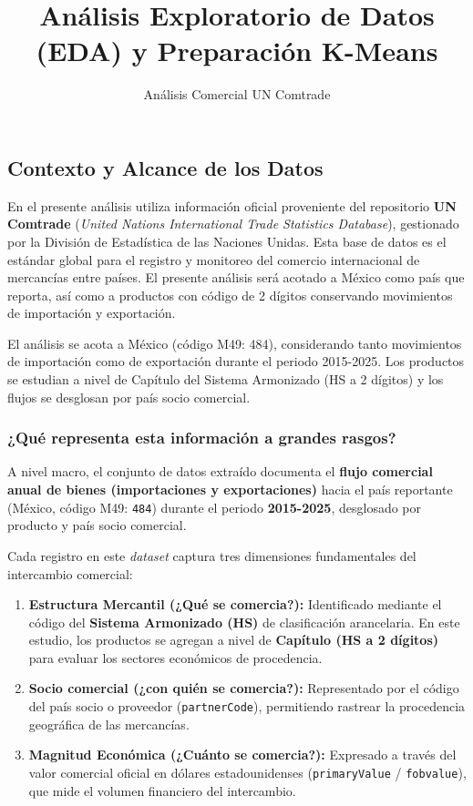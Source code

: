\documentclass[
]{article}
\title{Análisis Exploratorio de Datos (EDA) y Preparación K-Means}
\author{Análisis Comercial UN Comtrade}
\date{}
\providecommand{\tightlist}{%
  \setlength{\itemsep}{0pt}\setlength{\parskip}{0pt}}
\begin{document}
\maketitle

{
\setcounter{tocdepth}{2}
\tableofcontents
}
\subsection{Contexto y Alcance de los
Datos}\label{contexto-y-alcance-de-los-datos}

En el presente análisis utiliza información oficial proveniente del
repositorio \textbf{UN Comtrade} (\emph{United Nations International
Trade Statistics Database}), gestionado por la División de Estadística
de las Naciones Unidas. Esta base de datos es el estándar global para el
registro y monitoreo del comercio internacional de mercancías entre
países. El presente análisis será acotado a México como país que
reporta, así como a productos con código de 2 dígitos conservando
movimientos de importación y exportación.

El análisis se acota a México (código M49: 484), considerando tanto
movimientos de importación como de exportación durante el periodo
2015-2025. Los productos se estudian a nivel de Capítulo del Sistema
Armonizado (HS a 2 dígitos) y los flujos se desglosan por país socio
comercial.

\subsubsection{¿Qué representa esta información a grandes
rasgos?}\label{quuxe9-representa-esta-informaciuxf3n-a-grandes-rasgos}

A nivel macro, el conjunto de datos extraído documenta el \textbf{flujo
comercial anual de bienes (importaciones y exportaciones)} hacia el país
reportante (México, código M49: \texttt{484}) durante el periodo
\textbf{2015-2025}, desglosado por producto y país socio comercial.

Cada registro en este \emph{dataset} captura tres dimensiones
fundamentales del intercambio comercial:

\begin{enumerate}
\def\labelenumi{\arabic{enumi}.}
\tightlist
\item
  \textbf{Estructura Mercantil (¿Qué se comercia?):} Identificado
  mediante el código del \textbf{Sistema Armonizado (HS)} de
  clasificación arancelaria. En este estudio, los productos se agregan a
  nivel de \textbf{Capítulo (HS a 2 dígitos)} para evaluar los sectores
  económicos de procedencia.
\item
  \textbf{Socio comercial (¿con quién se comercia?):} Representado por
  el código del país socio o proveedor (\texttt{partnerCode}),
  permitiendo rastrear la procedencia geográfica de las mercancías.
\item
  \textbf{Magnitud Económica (¿Cuánto se comercia?):} Expresado a través
  del valor comercial oficial en dólares estadounidenses
  (\texttt{primaryValue} / \texttt{fobvalue}), que mide el volumen
  financiero del intercambio.
\end{enumerate}
\end{document}
